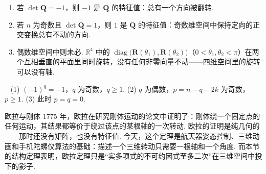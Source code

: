 \documentclass[lang=cn,10.5pt,scheme=chinese,toc=twocol,section,chinesefont=nofont,
twoside,citestyle=gb7714-2015,bibstyle=gb7714-2015]{elegantbook}
\DeclareRobustCommand{\textbf}[1]{{\lnsemiboldlatin\lnsemiboldcjk #1}}
\newcommand{\vv}[1]{\boldsymbol{#1}}
\numberwithin{equation}{section}   %
\newcommand{\diag}{\operatorname{diag}}
\newcommand*{\lnlabel}[1]{{\sffamily\bfseries\color{black}#1}}
\renewenvironment{proof}{%
	\par\noindent\lnlabel{\proofname}\;\ \color{black!90}\cfs}{\par}
\begin{document}
\begin{corollary}
  \begin{enumerate}
    \item 若 $\det\vv Q=-1$，则 $-1$ 是 $\vv Q$ 的特征值：总有一个方向被翻转.
    \item 若 $n$ 为奇数且 $\det\vv Q=1$，则 $1$ 是 $\vv Q$ 的特征值：奇数维空间中保持定向的正交变换总有不动的方向.
    \item 偶数维空间中则未必. $\mathbb{R}^4$ 中的 $\diag\big(\vv R(\theta_1),\vv R(\theta_2)\big)$（$0<\theta_1,\theta_2<\pi$）在两个互相垂直的平面里同时旋转，没有任何非零向量不动——\textbf{四维空间里的旋转可以没有轴}.
  \end{enumerate}
\end{corollary}
\begin{proof}
  (1) $(-1)^q=-1$，$q$ 为奇数，$q\ge1$. (2) $q$ 为偶数，$p=n-q-2k$ 为奇数，$p\ge1$. (3) 此时 $p=q=0$.
\end{proof}

\begin{historybox}{欧拉与刚体}
  1775 年，欧拉在研究刚体运动的论文\cite{euler1776formulae}中证明了：刚体绕一个固定点的任何运动，其结果都等价于绕过该点的某根轴的一次转动. 欧拉的证明是纯几何的——那时还没有矩阵，也没有特征值. 今天，这个定理是航天器姿态控制、三维动画和手机陀螺仪算法的基础：描述一个三维转动只需要一根轴和一个角度. 而本节的结构定理表明，欧拉定理只是“实多项式的不可约因式至多二次”在三维空间中投下的影子.
\end{historybox}
\end{document}
